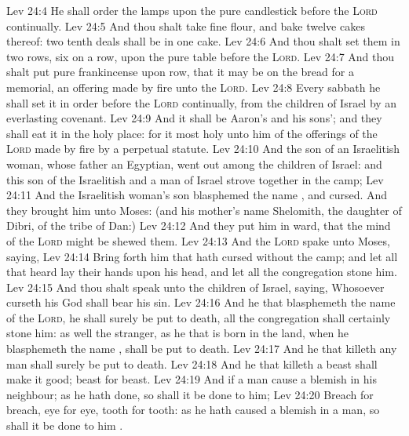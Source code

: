 \vs Lev 24:4 He shall order the lamps upon the pure candlestick before the \textsc{Lord} continually.
\vs Lev 24:5 And thou shalt take fine flour, and bake twelve cakes thereof: two tenth deals shall be in one cake.
\vs Lev 24:6 And thou shalt set them in two rows, six on a row, upon the pure table before the \textsc{Lord}.
\vs Lev 24:7 And thou shalt put pure frankincense upon  row, that it may be on the bread for a memorial,  an offering made by fire unto the \textsc{Lord}.
\vs Lev 24:8 Every sabbath he shall set it in order before the \textsc{Lord} continually,  from the children of Israel by an everlasting covenant.
\vs Lev 24:9 And it shall be Aaron's and his sons'; and they shall eat it in the holy place: for it  most holy unto him of the offerings of the \textsc{Lord} made by fire by a perpetual statute.
\vs Lev 24:10 And the son of an Israelitish woman, whose father  an Egyptian, went out among the children of Israel: and this son of the Israelitish  and a man of Israel strove together in the camp;
\vs Lev 24:11 And the Israelitish woman's son blasphemed the name , and cursed. And they brought him unto Moses: (and his mother's name  Shelomith, the daughter of Dibri, of the tribe of Dan:)
\vs Lev 24:12 And they put him in ward, that the mind of the \textsc{Lord} might be shewed them.
\vs Lev 24:13 And the \textsc{Lord} spake unto Moses, saying,
\vs Lev 24:14 Bring forth him that hath cursed without the camp; and let all that heard  lay their hands upon his head, and let all the congregation stone him.
\vs Lev 24:15 And thou shalt speak unto the children of Israel, saying, Whosoever curseth his God shall bear his sin.
\vs Lev 24:16 And he that blasphemeth the name of the \textsc{Lord}, he shall surely be put to death,  all the congregation shall certainly stone him: as well the stranger, as he that is born in the land, when he blasphemeth the name , shall be put to death.
\vs Lev 24:17 And he that killeth any man shall surely be put to death.
\vs Lev 24:18 And he that killeth a beast shall make it good; beast for beast.
\vs Lev 24:19 And if a man cause a blemish in his neighbour; as he hath done, so shall it be done to him;
\vs Lev 24:20 Breach for breach, eye for eye, tooth for tooth: as he hath caused a blemish in a man, so shall it be done to him .
